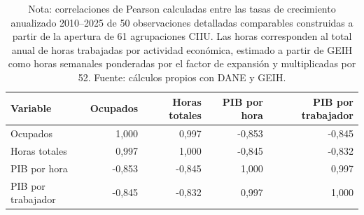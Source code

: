 \begin{table}[H]
\centering
\caption{Correlaciones entre crecimientos por actividad económica, 2010--2025}
\label{tab:pib_geih_productividad_sector_correlaciones}
\small
\begin{tabular}{lrrrr}
\toprule
Variable & Ocupados & Horas totales & PIB por hora & PIB por trabajador \\
\midrule
Ocupados & 1,000 & 0,997 & -0,853 & -0,845 \\
Horas totales & 0,997 & 1,000 & -0,845 & -0,832 \\
PIB por hora & -0,853 & -0,845 & 1,000 & 0,997 \\
PIB por trabajador & -0,845 & -0,832 & 0,997 & 1,000 \\
\bottomrule
\end{tabular}
\caption*{\footnotesize Nota: correlaciones de Pearson calculadas entre las tasas de crecimiento anualizado 2010--2025 de 50 observaciones detalladas comparables construidas a partir de la apertura de 61 agrupaciones CIIU. Las horas corresponden al total anual de horas trabajadas por actividad económica, estimado a partir de GEIH como horas semanales ponderadas por el factor de expansión y multiplicadas por 52. Fuente: cálculos propios con DANE y GEIH.}
\end{table}